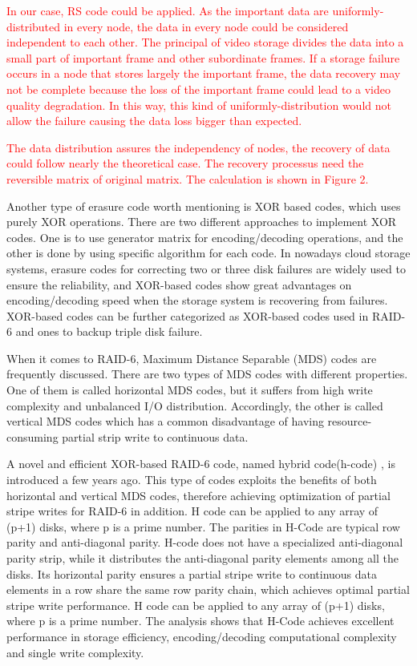 \documentclass[sigconf]{acmart}
\begin{document}
\textcolor{red}{In our case, RS code could be applied. As the important data are uniformly-distributed in every node, the data in every node could be considered independent to each other. The principal of video storage divides the data into a small part of important frame and other subordinate frames. If a storage failure occurs in a node that stores largely the important frame, the data recovery may not be complete because the loss of the important frame could lead to a video quality degradation. In this way, this kind of uniformly-distribution would not allow the failure causing the data loss bigger than expected.}

\textcolor{red}{The data distribution assures the independency of nodes, the recovery of data could follow nearly the theoretical case. The recovery processus need the reversible matrix of original matrix. The calculation is shown in Figure 2.}

Another type of erasure code worth mentioning is XOR based codes, which uses purely XOR operations. There are two different approaches to implement XOR codes. One is to use generator matrix\cite{plank2004practical} for encoding/decoding operations, and the other is done by using specific algorithm for each code\cite{huang2008star}. In nowadays cloud storage systems, erasure codes for correcting two or three disk failures are widely used to ensure the reliability, and XOR-based codes show great advantages on encoding/decoding speed when the storage system is recovering from failures. XOR-based codes can be further categorized as XOR-based codes used in RAID-6 and ones to backup triple disk failure.

When it comes to RAID-6, Maximum Distance Separable (MDS) \cite{jin2009p} \cite{cassuto2009cyclic} \cite{blaum1999lowest} \cite{corbett2004row} \cite{blaum1995evenodd} \cite{bloemer1995xor} codes are frequently discussed. There are two types of MDS codes with different properties. One of them is called horizontal MDS codes, but it suffers from high write complexity and unbalanced I/O distribution. Accordingly, the other is called vertical MDS codes which has a common disadvantage of having resource-consuming partial strip write to continuous data.

A novel and efficient XOR-based RAID-6 code, named hybrid code(h-code) \cite{inproceedings}, is introduced a few years ago. This type of codes exploits the benefits of both horizontal and vertical MDS codes, therefore achieving optimization of partial stripe writes for RAID-6 in addition. H code can be applied to any array of (p+1) disks, where p is a prime number. The parities in H-Code are typical row parity and anti-diagonal parity. H-code does not have a specialized anti-diagonal parity strip, while it distributes the anti-diagonal parity elements among all the disks. Its horizontal parity ensures a partial stripe write to continuous data elements in a row share the same row parity chain, which achieves optimal partial stripe write performance. H code can be applied to any array of (p+1) disks, where p is a prime number. The analysis shows that H-Code achieves excellent performance in storage efficiency, encoding/decoding computational complexity and single write complexity. 
\end{document}
